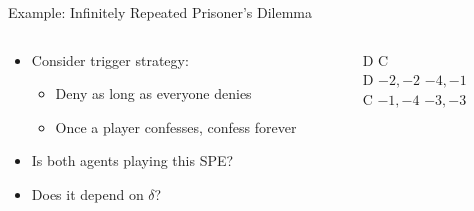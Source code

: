 \documentclass[11pt,aspectratio=169]{beamer}
\begin{document}
  \begin{frame}{Example: Infinitely Repeated Prisoner's Dilemma} 
   \begin{columns}
    \begin{column}{0.7\textwidth}
     \begin{itemize}[<+->]
     \setlength{\itemsep}{1.2em}
      \item Consider \alert{trigger} strategy:
      \begin{itemize}[<.->]
       \item Deny as long as everyone denies
       \item Once a player confesses, confess \alert{forever}
      \end{itemize}
      \item Is both agents playing this SPE?
      \item Does it depend on $\delta$?
     \end{itemize}
    \end{column}
    \begin{column}{0.3\textwidth}
     \begin{center}
      \begin{game}{2}{2}
      		\> D			\> C			\\
       D		\> $-2,-2$	\> $-4,-1$	\\
       C		\> $-1,-4$	\> $-3,-3$
      \end{game}
     \end{center}
    \end{column}
   \end{columns}
  \end{frame}
  
\end{document}
